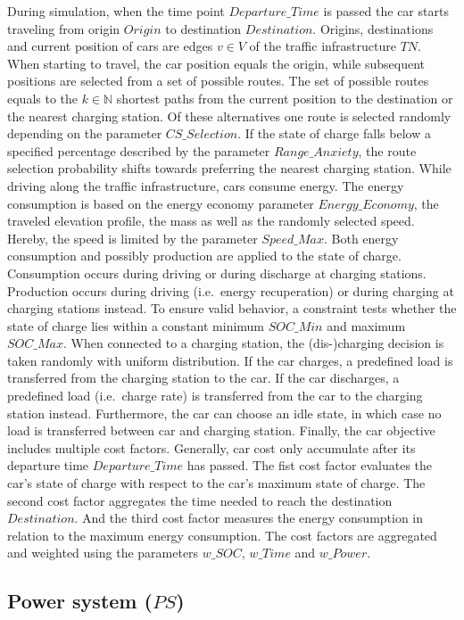 During simulation, when the time point $Departure\_Time$ is passed the car starts traveling from origin $Origin$ to destination $Destination$. Origins, destinations and current position of cars are edges $v \in V$ of the traffic infrastructure $TN$. When starting to travel, the car position equals the origin, while subsequent positions are selected from a set of possible routes. The set of possible routes equals to the $k \in \mathbb{N}$ shortest paths from the current position to the destination or the nearest charging station. Of these alternatives one route is selected randomly depending on the parameter $CS\_Selection$. If the state of charge falls below a specified percentage described by the parameter $Range\_Anxiety$, the route selection probability shifts towards preferring the nearest charging station. While driving along the traffic infrastructure, cars consume energy. The energy consumption is based on the energy economy parameter $Energy\_Economy$, the traveled elevation profile, the mass as well as the randomly selected speed. Hereby, the speed is limited by the parameter $Speed\_Max$. Both energy consumption and possibly production are applied to the state of charge. Consumption occurs during driving or during discharge at charging stations. Production occurs during driving (i.e.\ energy recuperation) or during charging at charging stations instead. To ensure valid behavior, a constraint tests whether the state of charge lies within a constant minimum $SOC\_Min$ and maximum $SOC\_Max$. When connected to a charging station, the (dis-)charging decision is taken randomly with uniform distribution. If the car charges, a predefined load is transferred from the charging station to the car. If the car discharges, a predefined load (i.e.\ charge rate) is transferred from the car to the charging station instead. Furthermore, the car can choose an idle state, in which case no load is transferred between car and charging station. Finally, the car objective includes multiple cost factors. Generally, car cost only accumulate after its departure time $Departure\_Time$ has passed. The fist cost factor evaluates the car's state of charge with respect to the car's maximum state of charge. The second cost factor aggregates the time needed to reach the destination $Destination$. And the third cost factor measures the energy consumption in relation to the maximum energy consumption. The cost factors are aggregated and weighted using the parameters $w\_SOC$, $w\_Time$ and $w\_Power$.

\subsection{Power system ($PS$)}

